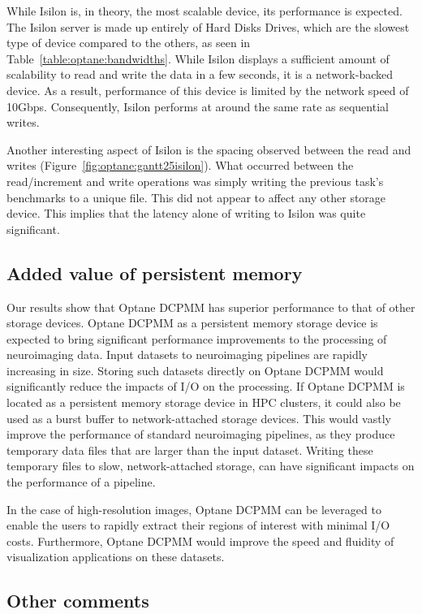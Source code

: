 While Isilon is, in theory, the most scalable device, its performance is
expected. The Isilon server is made up entirely of Hard Disks Drives, which are
the slowest type of device compared to the others, as seen in
Table~\ref{table:optane:bandwidths}. While Isilon displays a sufficient amount of
scalability to read and write the data in a few seconds, it is a network-backed
device. As a result, performance of this device is limited by the network speed
of 10Gbps. Consequently, Isilon performs at around the same rate as sequential
writes.

Another interesting aspect of Isilon is the spacing observed between the read
and writes (Figure~\ref{fig:optane:gantt25isilon}). What occurred between the
read/increment and write operations was simply writing the previous task's
benchmarks to a unique file. This did not appear to affect any other storage
device. This implies that the latency alone of writing to Isilon was quite
significant.

\subsection{Added value of persistent memory}

Our results show that Optane DCPMM has superior performance to that of other
storage devices. Optane DCPMM as a persistent memory storage device is expected
to bring significant performance improvements to the processing of neuroimaging
data. Input datasets to neuroimaging pipelines are rapidly increasing in size.
Storing such datasets directly on Optane DCPMM would significantly reduce the
impacts of I/O on the processing. If Optane DCPMM is located as a persistent
memory storage device in HPC clusters, it could also be used as a burst buffer
to network-attached storage devices. This would vastly improve the performance
of standard neuroimaging pipelines, as they produce temporary data files that
are larger than the input dataset. Writing these temporary files to slow,
network-attached storage, can have significant impacts on the performance of a
pipeline.

In the case of high-resolution images, Optane DCPMM can be leveraged to enable
the users to rapidly extract their regions of interest with minimal I/O costs.
Furthermore, Optane DCPMM would improve the speed and fluidity of visualization
applications on these datasets.

\subsection{Other comments}

